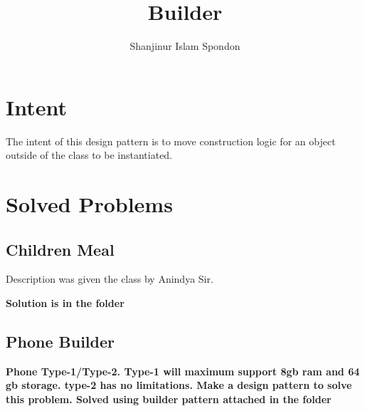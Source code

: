 \documentclass{article}
\title{Builder}
\author{Shanjinur Islam Spondon}
\begin{document}
	\maketitle 
	\section{Intent}
	The intent of this design pattern is to move construction logic for an object outside of the class to be instantiated.
	\section{Solved Problems}
	\subsection{Children Meal}
	Description was given the class by Anindya Sir. 

	\textbf{Solution is in the folder}

	\subsection{Phone Builder}
	\textbf{Phone Type-1/Type-2. Type-1 will maximum support 8gb ram and 64 gb storage. type-2 has no limitations. Make a design pattern to solve this problem. Solved using builder pattern attached in the folder}
\end{document}
